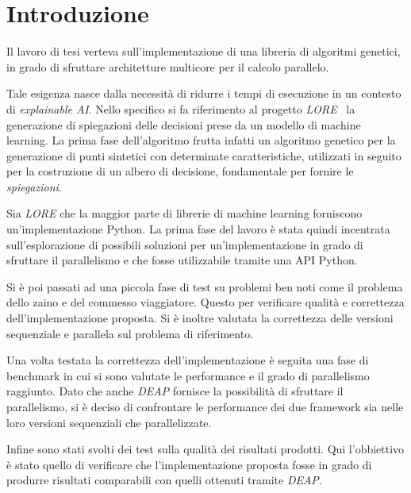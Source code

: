 \chapter*{Introduzione}

Il lavoro di tesi verteva sull'implementazione di una libreria di algoritmi
genetici, in grado di sfruttare architetture multicore per il calcolo parallelo.

Tale esigenza nasce dalla necessità di ridurre i tempi di esecuzione in un
contesto di \textit{explainable AI}. Nello specifico si fa riferimento al
progetto \textit{LORE}~\cite{DBLP:journals/corr/abs-1805-10820} la generazione
di spiegazioni delle decisioni prese da un modello di machine learning. La prima
fase dell'algoritmo frutta infatti un algoritmo genetico per la generazione di
punti sintetici con determinate caratteristiche, utilizzati in seguito per la
costruzione di un albero di decisione, fondamentale per fornire le
\textit{spiegazioni}.

Sia \textit{LORE} che la maggior parte di librerie di machine learning
forniscono un'implementazione Python. La prima fase del lavoro è stata quindi
incentrata sull'esplorazione di possibili soluzioni per un'implementazione in
grado di sfruttare il parallelismo e che fosse utilizzabile tramite una API
Python.

Si è poi passati ad una piccola fase di test su problemi ben noti come il
problema dello zaino e del commesso viaggiatore. Questo per verificare qualità
e correttezza dell'implementazione proposta. Si è inoltre valutata la
correttezza delle versioni sequenziale e parallela sul problema di riferimento.

Una volta testata la correttezza dell'implementazione è seguita una fase di
benchmark in cui si sono valutate le performance e il grado di parallelismo
raggiunto. Dato che anche \textit{DEAP} fornisce la possibilità di sfruttare il
parallelismo, si è deciso di confrontare le performance dei due framework sia
nelle loro versioni sequenziali che parallelizzate.

Infine sono stati svolti dei test sulla qualità dei risultati prodotti. Qui
l'obbiettivo è stato quello di verificare che l'implementazione proposta fosse
in grado di produrre risultati comparabili con quelli ottenuti tramite
\textit{DEAP}.